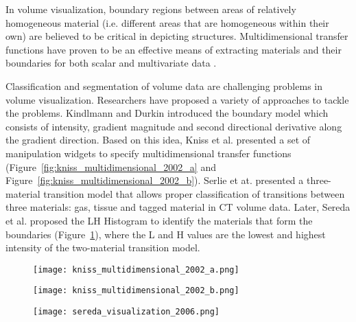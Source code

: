 In volume visualization, boundary regions between areas of relatively homogeneous material (i.e. different areas that are homogeneous within their own) are believed to be critical in depicting structures. Multidimensional transfer functions have proven to be an effective means of extracting materials and their boundaries for both scalar and multivariate data \cite{park_multi-dimensional_2004} \cite{maciejewski_structuring_2009}.

Classification and segmentation of volume data are challenging problems in volume visualization. Researchers have proposed a variety of approaches to tackle the problems.
Kindlmann and Durkin \cite{kindlmann_semi-automatic_1998} introduced the boundary model which consists of intensity, gradient magnitude and second directional derivative along the gradient direction.
Based on this idea, Kniss et al. \cite{kniss_multidimensional_2002} presented a set of manipulation widgets to specify multidimensional transfer functions (Figure~\ref{fig:kniss_multidimensional_2002_a} and Figure~\ref{fig:kniss_multidimensional_2002_b}).
Serlie et at. \cite{serlie_computed_2003} presented a three-material transition model that allows proper classification of transitions between three materials: gas, tissue and tagged material in CT volume data. Later, Sereda et al. \cite{sereda_visualization_2006} proposed the LH Histogram to identify the materials that form the boundaries (Figure~\ref{fig:sereda_visualization_2006}), where the L and H values are the lowest and highest intensity of the two-material transition model.

\begin{figure}
	\centering
	\begin{minipage}{.33\textwidth}
		\centering
		\texttt{[image: kniss\_multidimensional\_2002\_a.png]}
		\caption{\cite{kniss_multidimensional_2002}}
		\label{fig:kniss_multidimensional_2002_a}
	\end{minipage}%
	\begin{minipage}{.33\textwidth}
		\centering
		\texttt{[image: kniss\_multidimensional\_2002\_b.png]}
		\caption{\cite{kniss_multidimensional_2002}}
		\label{fig:kniss_multidimensional_2002_b}
	\end{minipage}
	\begin{minipage}{.33\textwidth}
		\centering
		\texttt{[image: sereda\_visualization\_2006.png]}
		\caption{\cite{sereda_visualization_2006}}
		\label{fig:sereda_visualization_2006}
	\end{minipage}
\end{figure}


